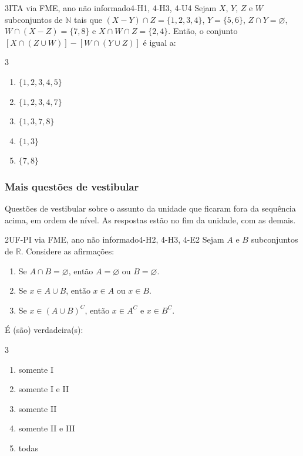\begin{questao}{3}{ITA via FME, ano não informado}{4-H1, 4-H3, 4-U4}\label{u4:ita47}
Sejam $X$, $Y$, $Z$ e $W$ subconjuntos de $\mathbb{N}$ tais que $(X-Y)\cap Z=\{1,2,3,4\}$, $Y=\{5,6\}$, $Z\cap Y=\varnothing$, $W\cap(X-Z)=\{7,8\}$ e $X\cap W\cap Z=\{2,4\}$. Então, o conjunto $[X\cap(Z\cup W)]-[W\cap(Y\cup Z)]$ é igual a:
\begin{multicols}{3}
\begin{enumerate}[label=\alph*)]
  \item $\{1,2,3,4,5\}$
  \item $\{1,2,3,4,7\}$
  \item $\{1,3,7,8\}$
  \item $\{1,3\}$
  \item $\{7,8\}$
\end{enumerate}
\end{multicols}
\end{questao}

\subsubsection*{Mais questões de vestibular}
Questões de vestibular sobre o assunto da unidade que ficaram fora da sequência acima, em ordem de nível. As respostas estão no fim da unidade, com as demais.

\begin{questao}{2}{UF-PI via FME, ano não informado}{4-H2, 4-H3, 4-E2}\label{u4:ufpi38}
Sejam $A$ e $B$ subconjuntos de $\mathbb{R}$. Considere as afirmações:
\begin{enumerate}[label=\Roman*.]
  \item Se $A\cap B=\varnothing$, então $A=\varnothing$ ou $B=\varnothing$.
  \item Se $x\in A\cup B$, então $x\in A$ ou $x\in B$.
  \item Se $x\in(A\cup B)^{C}$, então $x\in A^{C}$ e $x\in B^{C}$.
\end{enumerate}
É (são) verdadeira(s):
\begin{multicols}{3}
\begin{enumerate}[label=\alph*)]
  \item somente I
  \item somente I e II
  \item somente II
  \item somente II e III
  \item todas
\end{enumerate}
\end{multicols}
\end{questao}

